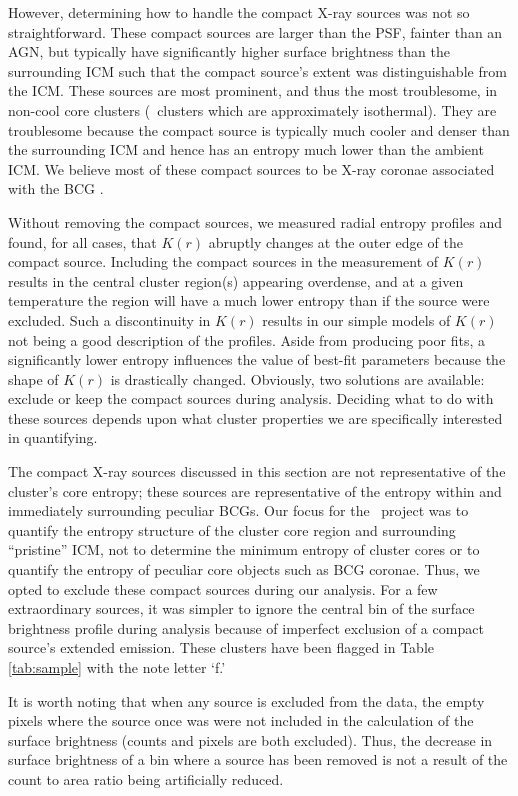 \documentclass[12pt,preprint]{aastex}
\begin{document}
However, determining how to handle the compact X-ray sources was not
so straightforward. These compact sources are larger than the PSF,
fainter than an AGN, but typically have significantly higher surface
brightness than the surrounding ICM such that the compact source's
extent was distinguishable from the ICM. These sources are most
prominent, and thus the most troublesome, in non-cool core clusters
(\ie\ clusters which are approximately isothermal). They are
troublesome because the compact source is typically much cooler and
denser than the surrounding ICM and hence has an entropy much lower
than the ambient ICM. We believe most of these compact sources to be
X-ray coronae associated with the BCG \citep[see][for discussion of
  BCG coronae]{coronae}.

Without removing the compact sources, we measured radial entropy
profiles and found, for all cases, that $K(r)$ abruptly changes at the
outer edge of the compact source. Including the compact sources in the
measurement of $K(r)$ results in the central cluster region(s)
appearing overdense, and at a given temperature the region will have a
much lower entropy than if the source were excluded. Such a
discontinuity in $K(r)$ results in our simple models of $K(r)$ not
being a good description of the profiles. Aside from producing poor
fits, a significantly lower entropy influences the value of best-fit
parameters because the shape of $K(r)$ is drastically
changed. Obviously, two solutions are available: exclude or keep the
compact sources during analysis.  Deciding what to do with these
sources depends upon what cluster properties we are specifically
interested in quantifying.

The compact X-ray sources discussed in this section are not
representative of the cluster's core entropy; these sources are
representative of the entropy within and immediately surrounding
peculiar BCGs. Our focus for the \accept\ project was to quantify the
entropy structure of the cluster core region and surrounding
``pristine'' ICM, not to determine the minimum entropy of cluster
cores or to quantify the entropy of peculiar core objects such as BCG
coronae. Thus, we opted to exclude these compact sources during our
analysis. For a few extraordinary sources, it was simpler to ignore
the central bin of the surface brightness profile during analysis
because of imperfect exclusion of a compact source's extended
emission. These clusters have been flagged in Table \ref{tab:sample}
with the note letter `f.'

It is worth noting that when any source is excluded from the data, the
empty pixels where the source once was were not included in the
calculation of the surface brightness (counts and pixels are both
excluded). Thus, the decrease in surface brightness of a bin where a
source has been removed is not a result of the count to area ratio
being artificially reduced.
\end{document}

